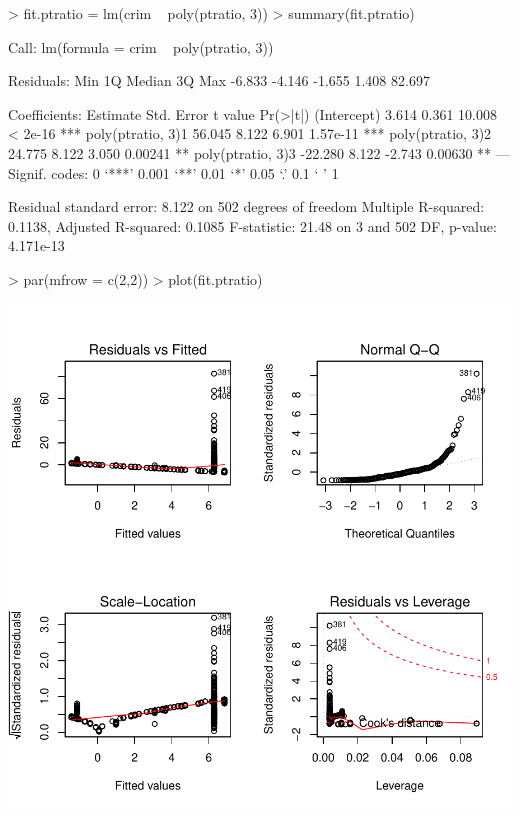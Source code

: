 \documentclass[a4paper]{article}
\begin{document}
\begin{Schunk}
\begin{Sinput}
> fit.ptratio = lm(crim ~ poly(ptratio, 3))
> summary(fit.ptratio)
\end{Sinput}
\begin{Soutput}
Call:
lm(formula = crim ~ poly(ptratio, 3))

Residuals:
   Min     1Q Median     3Q    Max 
-6.833 -4.146 -1.655  1.408 82.697 

Coefficients:
                  Estimate Std. Error t value Pr(>|t|)    
(Intercept)          3.614      0.361  10.008  < 2e-16 ***
poly(ptratio, 3)1   56.045      8.122   6.901 1.57e-11 ***
poly(ptratio, 3)2   24.775      8.122   3.050  0.00241 ** 
poly(ptratio, 3)3  -22.280      8.122  -2.743  0.00630 ** 
---
Signif. codes:  0 ‘***’ 0.001 ‘**’ 0.01 ‘*’ 0.05 ‘.’ 0.1 ‘ ’ 1

Residual standard error: 8.122 on 502 degrees of freedom
Multiple R-squared:  0.1138,	Adjusted R-squared:  0.1085 
F-statistic: 21.48 on 3 and 502 DF,  p-value: 4.171e-13
\end{Soutput}
\begin{Sinput}
> par(mfrow = c(2,2))
> plot(fit.ptratio)
\end{Sinput}
\end{Schunk}
\includegraphics{mutivariblelm-ptratio2}
\end{document}

